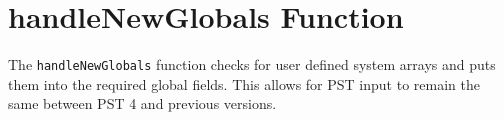 \section{handleNewGlobals Function} 

The \verb|handleNewGlobals| function checks for user defined system arrays and puts them into the required global fields.
This allows for PST input to remain the same between PST 4 and previous versions.
